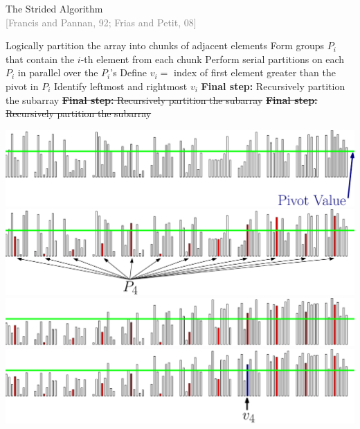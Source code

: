 \documentclass[xcolor=x11names, svgnames, rgb]{beamer}
\newcommand{\citefont}[1]{{\tiny \textcolor{Gray}{#1}}}
\begin{document}
\begin{frame}[t]{}
	\vfill
	\begin{center}
		{\Huge The Strided Algorithm}\\
		\citefont{[Francis and Pannan, 92; Frias and Petit, 08]}
	\end{center}
	\vfill
\end{frame}



\begin{frame}[t]{}%
	\vspace{0.25cm}
	\begin{overprint}
	Logically partition the array into chunks of adjacent elements
	\onslide<2>Form groups $P_i$ that contain the $i$-th element from each chunk
	\onslide<3>Perform serial partitions on each $P_i$ in parallel over the $P_i$'s
	\onslide<4>Define $v_i=$ index of first element greater than the pivot in $P_i$
	\onslide<5>Identify leftmost and rightmost $v_i$
	\onslide<6> \textbf{Final step:} Recursively partition the subarray
	\onslide<7> \st{\textbf{Final step:} Recursively partition the subarray}  
	\onslide<8> \st{\textbf{Final step:} Recursively partition the subarray}  
	\end{overprint}
	\vspace{0.25cm}
	\begin{overprint}
	\includegraphics[width=\linewidth]{imgs/stridedAlgSim/sim1.eps}
	\onslide<2>\includegraphics[width=\linewidth]{imgs/stridedAlgSim/sim2.eps}
	\onslide<3>\includegraphics[width=\linewidth]{imgs/stridedAlgSim/sim3.eps}
	\onslide<4>\includegraphics[width=\linewidth]{imgs/stridedAlgSim/sim35.eps}

\end{overprint}
\end{frame}
\end{document}
